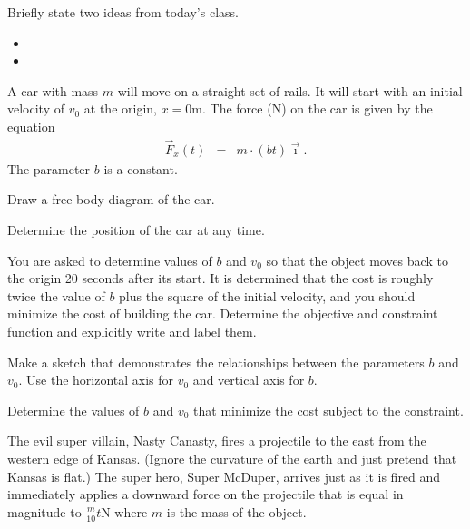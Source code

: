 \begin{problem}
\item Briefly state two ideas from today's class.
  \begin{itemize}
  \item
  \item
  \end{itemize}
\item A car with mass $m$ will move on a straight set of rails. It
  will start with an initial velocity of $v_0$ at the origin,
  $x=0$m. The force (N) on the car is given by the equation
  \begin{eqnarray*}
    \vec{F}_x(t) & = & m\cdot(bt) \vec{\imath}.
  \end{eqnarray*}
  The parameter $b$ is a constant.

  \begin{subproblem}
    \item Draw a free body diagram of the car.
      \vfill
    \item Determine the position of the car at any time.
      \vfill

      \clearpage

    \item You are asked to determine values of $b$ and $v_0$ so that
      the object moves back to the origin 20 seconds after its
      start. It is determined that the cost is roughly twice the value
      of $b$ plus the square of the initial velocity, and you should
      minimize the cost of building the car. Determine the objective
      and constraint function and explicitly write and label them.

      \vfill

    \item Make a sketch that demonstrates the relationships between
      the parameters $b$ and $v_0$. Use the horizontal axis for $v_0$
      and vertical axis for $b$.

      \vfill

      \clearpage

    \item Determine the values of $b$ and $v_0$ that minimize the cost
      subject to the constraint.

      \vfill

  \end{subproblem}

  \clearpage

\item The evil super villain, Nasty Canasty, fires a projectile to the
  east from the western edge of Kansas.  (Ignore the curvature of the
  earth and just pretend that Kansas is flat.)  The super hero, Super
  McDuper, arrives just as it is fired and immediately applies a
  downward force on the projectile that is equal in magnitude to
  $\frac{m}{10}t$N where $m$ is the mass of the object.


\end{problem}
